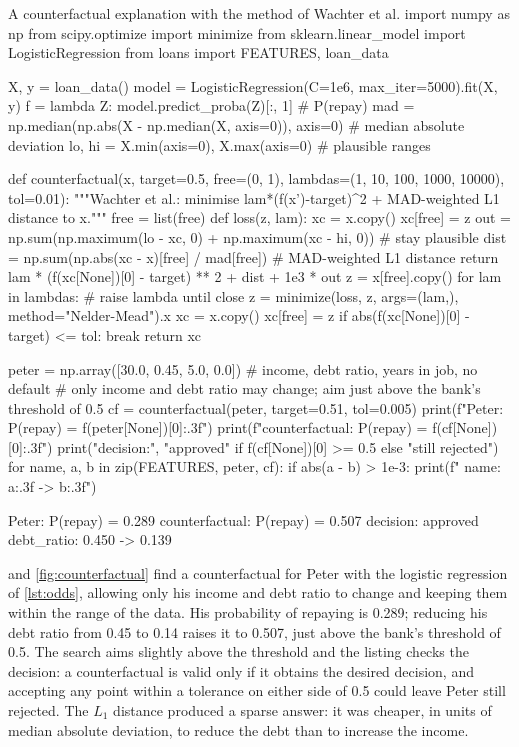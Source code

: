 \begin{pylisting}[label={lst:counterfactual}]{A counterfactual explanation with the method of Wachter et al.}
import numpy as np
from scipy.optimize import minimize
from sklearn.linear_model import LogisticRegression
from loans import FEATURES, loan_data

X, y = loan_data()
model = LogisticRegression(C=1e6, max_iter=5000).fit(X, y)
f = lambda Z: model.predict_proba(Z)[:, 1]                    # P(repay)
mad = np.median(np.abs(X - np.median(X, axis=0)), axis=0)      # median absolute deviation
lo, hi = X.min(axis=0), X.max(axis=0)                          # plausible ranges

def counterfactual(x, target=0.5, free=(0, 1), lambdas=(1, 10, 100, 1000, 10000), tol=0.01):
    """Wachter et al.: minimise lam*(f(x')-target)^2 + MAD-weighted L1 distance to x."""
    free = list(free)
    def loss(z, lam):
        xc = x.copy()
        xc[free] = z
        out = np.sum(np.maximum(lo - xc, 0) + np.maximum(xc - hi, 0))   # stay plausible
        dist = np.sum(np.abs(xc - x)[free] / mad[free])          # MAD-weighted L1 distance
        return lam * (f(xc[None])[0] - target) ** 2 + dist + 1e3 * out
    z = x[free].copy()
    for lam in lambdas:                                        # raise lambda until close
        z = minimize(loss, z, args=(lam,), method="Nelder-Mead").x
        xc = x.copy()
        xc[free] = z
        if abs(f(xc[None])[0] - target) <= tol:
            break
    return xc

peter = np.array([30.0, 0.45, 5.0, 0.0])     # income, debt ratio, years in job, no default
# only income and debt ratio may change; aim just above the bank's threshold of 0.5
cf = counterfactual(peter, target=0.51, tol=0.005)
print(f"Peter:          P(repay) = {f(peter[None])[0]:.3f}")
print(f"counterfactual: P(repay) = {f(cf[None])[0]:.3f}")
print("decision:", "approved" if f(cf[None])[0] >= 0.5 else "still rejected")
for name, a, b in zip(FEATURES, peter, cf):
    if abs(a - b) > 1e-3:
        print(f"  {name}: {a:.3f} -> {b:.3f}")
\end{pylisting}
\begin{pyoutput}
Peter:          P(repay) = 0.289
counterfactual: P(repay) = 0.507
decision: approved
  debt_ratio: 0.450 -> 0.139
\end{pyoutput}

 and \cref{fig:counterfactual} find a counterfactual for Peter with the
logistic regression of \cref{lst:odds}, allowing only his income and debt ratio to change and keeping
them within the range of the data. His probability of repaying is 0.289; reducing his debt ratio from
0.45 to 0.14 raises it to 0.507, just above the bank's threshold of 0.5. The search aims slightly above
the threshold and the listing checks the decision: a counterfactual is valid only if it obtains the
desired decision, and accepting any point within a tolerance on either side of 0.5 could leave Peter
still rejected. The $L_1$ distance produced a sparse answer: it
was cheaper, in units of median absolute deviation, to reduce the debt than to increase the income.

